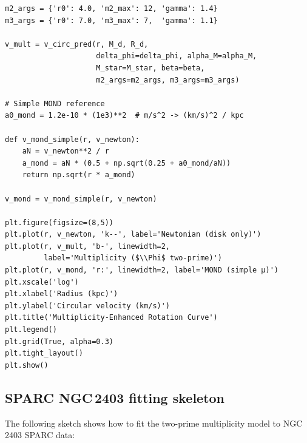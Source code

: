 \documentclass[11pt]{article}
\begin{document}
\begin{verbatim}
m2_args = {'r0': 4.0, 'm2_max': 12, 'gamma': 1.4}
m3_args = {'r0': 7.0, 'm3_max': 7,  'gamma': 1.1}

v_mult = v_circ_pred(r, M_d, R_d,
                     delta_phi=delta_phi, alpha_M=alpha_M,
                     M_star=M_star, beta=beta,
                     m2_args=m2_args, m3_args=m3_args)

# Simple MOND reference
a0_mond = 1.2e-10 * (1e3)**2  # m/s^2 -> (km/s)^2 / kpc

def v_mond_simple(r, v_newton):
    aN = v_newton**2 / r
    a_mond = aN * (0.5 + np.sqrt(0.25 + a0_mond/aN))
    return np.sqrt(r * a_mond)

v_mond = v_mond_simple(r, v_newton)

plt.figure(figsize=(8,5))
plt.plot(r, v_newton, 'k--', label='Newtonian (disk only)')
plt.plot(r, v_mult, 'b-', linewidth=2,
         label='Multiplicity ($\\Phi$ two-prime)')
plt.plot(r, v_mond, 'r:', linewidth=2, label='MOND (simple μ)')
plt.xscale('log')
plt.xlabel('Radius (kpc)')
plt.ylabel('Circular velocity (km/s)')
plt.title('Multiplicity-Enhanced Rotation Curve')
plt.legend()
plt.grid(True, alpha=0.3)
plt.tight_layout()
plt.show()
\end{verbatim}

\subsection{SPARC NGC\,2403 fitting skeleton}

The following sketch shows how to fit the two-prime multiplicity model to NGC\,2403 SPARC data:
\end{document}
